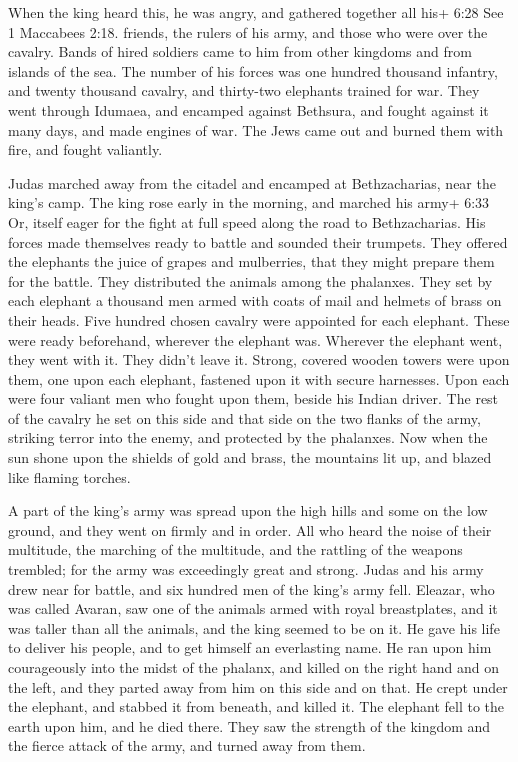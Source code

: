  When the king heard this, he was angry, and gathered
together all his+ 6:28 See 1 Maccabees 2:18. friends, the rulers of his
army, and those who were over the cavalry.  Bands of hired
soldiers came to him from other kingdoms and from islands of the sea.
 The number of his forces was one hundred thousand
infantry, and twenty thousand cavalry, and thirty-two elephants trained
for war.  They went through Idumaea, and encamped against
Bethsura, and fought against it many days, and made engines of war. The
Jews came out and burned them with fire, and fought valiantly.

 Judas marched away from the citadel and encamped at
Bethzacharias, near the king's camp.  The king rose early
in the morning, and marched his army+ 6:33 Or, itself eager for the
fight at full speed along the road to Bethzacharias. His forces made
themselves ready to battle and sounded their trumpets. 
They offered the elephants the juice of grapes and mulberries, that they
might prepare them for the battle.  They distributed the
animals among the phalanxes. They set by each elephant a thousand men
armed with coats of mail and helmets of brass on their heads. Five
hundred chosen cavalry were appointed for each elephant. 
These were ready beforehand, wherever the elephant was. Wherever the
elephant went, they went with it. They didn't leave it. 
Strong, covered wooden towers were upon them, one upon each elephant,
fastened upon it with secure harnesses. Upon each were four valiant men
who fought upon them, beside his Indian driver.  The rest
of the cavalry he set on this side and that side on the two flanks of
the army, striking terror into the enemy, and protected by the
phalanxes.  Now when the sun shone upon the shields of gold
and brass, the mountains lit up, and blazed like flaming torches.

 A part of the king's army was spread upon the high hills
and some on the low ground, and they went on firmly and in order.
 All who heard the noise of their multitude, the marching
of the multitude, and the rattling of the weapons trembled; for the army
was exceedingly great and strong.  Judas and his army drew
near for battle, and six hundred men of the king's army fell.
 Eleazar, who was called Avaran, saw one of the animals
armed with royal breastplates, and it was taller than all the animals,
and the king seemed to be on it.  He gave his life to
deliver his people, and to get himself an everlasting name.
 He ran upon him courageously into the midst of the
phalanx, and killed on the right hand and on the left, and they parted
away from him on this side and on that.  He crept under the
elephant, and stabbed it from beneath, and killed it. The elephant fell
to the earth upon him, and he died there.  They saw the
strength of the kingdom and the fierce attack of the army, and turned
away from them.

